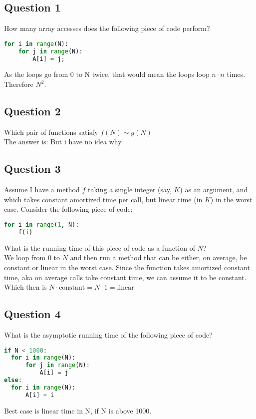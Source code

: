 \subsection{Question 1}
How many array accesses does the following piece of code perform?

\begin{lstlisting}[language=python]
for i in range(N):
    for j in range(N):
        A[i] = j;
\end{lstlisting}
As the loops go from 0 to N twice, that would mean the loops loop $n\cdot n$ times. Therefore $N^2$.\\[1ex]


\subsection{Question 2}
Which pair of functions satisfy $f(N)\sim g(N)$\\
The answer is: But i have no idea why\\[1ex]


\subsection{Question 3}
Assume I have a method $f$ taking a single integer (say, $K$) as an argument, and which takes constant amortized time per call, but linear time (in $K$) in the worst case. Consider the following piece of code:
\begin{lstlisting}[language=python]
for i in range(1, N):
    f(i)
\end{lstlisting}
What is the running time of this piece of code as a function of $N$?\\
We loop from 0 to $N$ and then run a method that can be either, on average, be constant or linear in the worst case.
Since the function takes amortized constant time, aka on average calls take constant time, we can assume it to be constant. 
Which then is $N\cdot \text{constant} = N\cdot 1 = \text{linear}$\\[1ex]


\subsection{Question 4}
What is the asymptotic running time of the following piece of code?
\begin{lstlisting}[language=python]
if N < 1000: 
  for i in range(N):
      for j in range(N):
          A[i] = j
else:
  for i in range(N):
      A[i] = i
\end{lstlisting}
Best case is linear time in N, if N is above 1000.\\[1ex]


